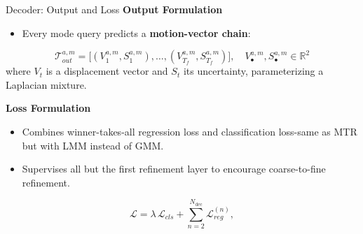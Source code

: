 \documentclass[10pt,aspectratio=169]{beamer}
\begin{document}
\begin{frame}{Decoder: Output and Loss}
    \textbf{Output Formulation}
    \begin{itemize}
        \item Every mode query predicts a \textbf{motion-vector chain}:
    \end{itemize}
    \begin{equation}
    \mathcal{T}_{out}^{a,m} = \bigl[(V_1^{a,m},S_1^{a,m}),\dots,(V_{T_f}^{a,m},S_{T_f}^{a,m})\bigr], \quad V_\bullet^{a,m}, S_\bullet^{a,m} \in \mathbb{R}^2
    \end{equation}
    where \(V_t\) is a displacement vector and \(S_t\) its uncertainty, parameterizing a Laplacian mixture.

    \vspace{1em}
    \textbf{Loss Formulation}
    \begin{itemize}
        \item Combines winner-takes-all regression loss and classification loss-same as MTR but with LMM instead of GMM.
        \item Supervises all but the first refinement layer to encourage coarse-to-fine refinement.
    \end{itemize}

    \begin{equation}
    \mathcal{L}
    = \lambda\,\mathcal{L}_{cls}
        + \sum_{n=2}^{N_{\text{dec}}}\mathcal{L}_{reg}^{(n)},
    \label{eq:lm_loss}
    \end{equation}
\end{frame}




\end{document}
